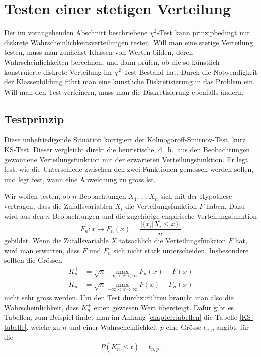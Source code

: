\section{Testen einer stetigen Verteilung}
\label{section-testen-stetiger-wkeitsverteilung}
Der im vorangehenden Abschnitt beschriebene $\chi^2$-Test kann prinzipbedingt
nur diskrete Wahrscheinlichkeitsverteilungen testen.
Will man eine stetige
Verteilung testen, muss man zunächst Klassen von Werten bilden,
deren Wahrscheinlichkeiten berechnen, und dann prüfen, ob die so
künstlich konstruierte diskrete Verteilung im $\chi^2$-Test Bestand hat.
Durch die Notwendigkeit der Klassenbildung führt man eine künstliche
Diskretisierung in das Problem ein.
Will man den Test verfeinern, muss man
die Diskretisierung ebenfalls ändern.

\subsection{Testprinzip}
Diese unbefriedigende Situation korrigiert der Kolmogoroff-Smirnov-Test,
kurz KS-Test.
Dieser vergleicht direkt die heuristische, d.~h.~aus den Beobachtungen gewonnene
Verteilungsfunktion mit der erwarteten Verteilungsfunktion.
Er legt fest,
wie die Unterschiede zwischen den zwei Funktionen gemessen werden sollen,
und legt fest, wann eine Abweichung zu gross ist.

Wir wollen testen, ob $n$ Beobachtungen $X_1,\dots,X_n$ sich mit
der Hypothese vertragen, dass die Zufallsvariablen $X_i$ die
Verteilungsfunktion $F$ haben.
Dazu wird aus den $n$ Beobachtungen
und die zugehörige empirische Verteilungsfunktion
\[
F_n\colon x\mapsto F_n(x)=\frac{|\{x_i|X_i\le x\}|}{n}
\]
gebildet.
Wenn die Zufallsvariable $X$ tatsächlich die
Verteilungsfunktion $F$ hat, wird man erwarten,
dass $F$ und $F_n$ sich nicht stark unterscheiden.
Insbesondere sollten die Grössen
\begin{align}
K_n^+
&=
\sqrt{n}\max_{-\infty<x<\infty} F_n(x)-F(x)
\\
K_n^-
&=
\sqrt{n}\max_{-\infty<x<\infty} F(x)-F_n(x)
\end{align}
nicht sehr gross werden.
Um den Test durchzuführen braucht man also
die Wahrscheinlichkeit, dass $K_n^{\pm}$ einen gewissen Wert übersteigt.
Dafür gibt es Tabellen, zum Beispiel findet man im Anhang \ref{chapter:tabellen}
die Tabelle \ref{KS-tabelle}, welche zu $n$ und einer Wahrscheinlichkeit
$p$ eine Grösse $t_{n,p}$ angibt, für die
\[
P(K_n^+\le t)=t_{n,p}.
\]

